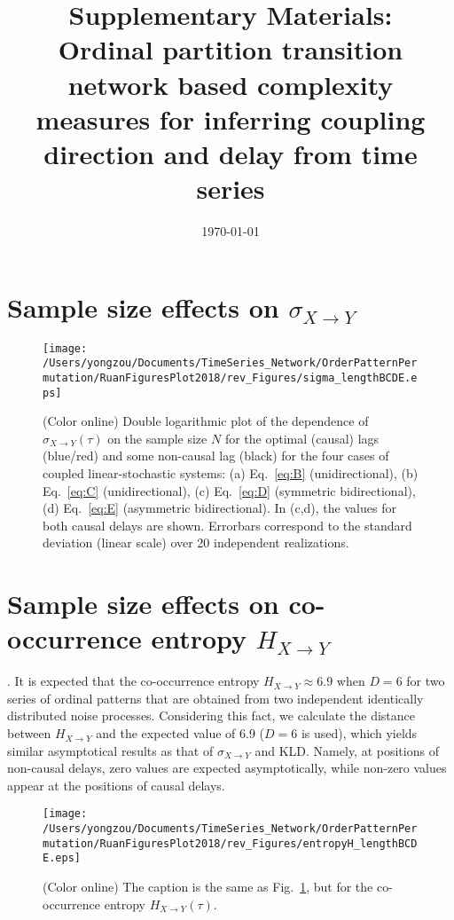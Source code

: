 \documentclass[aps,pre,superscriptaddress,floats,11pt]{revtex4}
\begin{document}
\title{Supplementary Materials: \\ Ordinal partition transition network based complexity measures for inferring coupling direction and delay from time series}

\date{\today}

\maketitle

\renewcommand{\thepage}{SM-\arabic{page}}  
\renewcommand{\thesection}{SM-\Roman{section}}   
\renewcommand{\theequation}{S\arabic{equation}}  
\renewcommand{\thetable}{S\arabic{table}}   
\renewcommand{\thefigure}{S\arabic{figure}}

\section{Sample size effects on $\sigma_{X\to Y}$}
\begin{figure}[htb]
	\centering
	\texttt{[image: /Users/yongzou/Documents/TimeSeries\_Network/OrderPatternPermutation/RuanFiguresPlot2018/rev\_Figures/sigma\_lengthBCDE.eps]}
\caption{(Color online) Double logarithmic plot of the dependence of $\sigma_{X\to Y}(\tau)$ on the sample size $N$ for the optimal (causal) lags (blue/red) and some non-causal lag (black) for the four cases of coupled linear-stochastic systems: (a) Eq.~\eqref{eq:B} (unidirectional), (b) Eq.~\eqref{eq:C} (unidirectional), (c) Eq.~\eqref{eq:D} (symmetric bidirectional), (d) Eq.~\eqref{eq:E} (asymmetric bidirectional). In (c,d), the values for both causal delays are shown. Errorbars correspond to the standard deviation (linear scale) over 20 independent realizations.  \label{fig:sampleSizeBCDEsigma}}
\end{figure}


\section{Sample size effects on co-occurrence entropy $H_{X\to Y}$}. 
It is expected that the co-occurrence entropy $H_{X \to Y} \approx 6.9$ when $D = 6$ for two series of ordinal patterns that are obtained from two independent identically distributed noise processes. Considering this fact, we calculate the distance between $H_{X \to Y}$ and the expected value of 6.9 ($D = 6$ is used), which yields similar asymptotical results as that of $\sigma_{X\to Y}$ and KLD. Namely, at positions of non-causal delays, zero values are expected asymptotically, while non-zero values appear at the positions of causal delays. 
\begin{figure}[htb]
	\centering
	\texttt{[image: /Users/yongzou/Documents/TimeSeries\_Network/OrderPatternPermutation/RuanFiguresPlot2018/rev\_Figures/entropyH\_lengthBCDE.eps]}
\caption{(Color online) The caption is the same as Fig.~\ref{fig:sampleSizeBCDEsigma}, but for the co-occurrence entropy $H_{X\to Y}(\tau)$. \label{fig:sampleSizeBCDEentropy}}
\end{figure}
\end{document}
